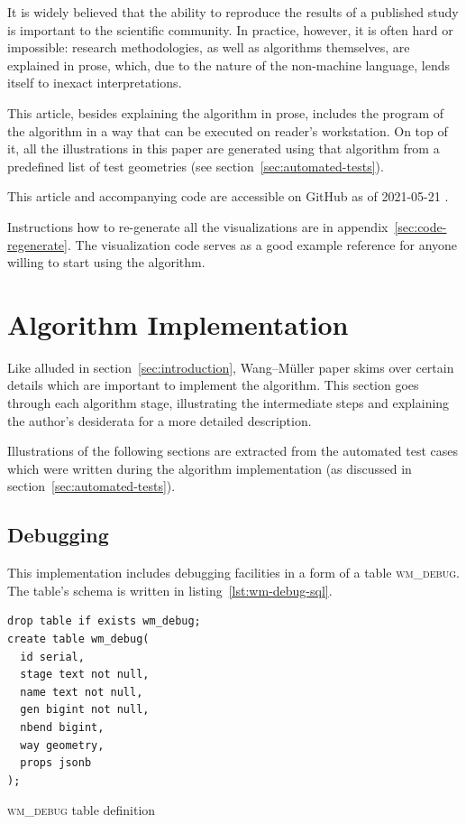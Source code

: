\documentclass[a4paper]{article}
\newcommand{\WM}{Wang--M{\"u}ller}
\begin{document}
It is widely believed that the ability to reproduce the results of a published
study is important to the scientific community. In practice, however, it is
often hard or impossible: research methodologies, as well as algorithms
themselves, are explained in prose, which, due to the nature of the non-machine
language, lends itself to inexact interpretations.

This article, besides explaining the algorithm in prose, includes the program
of the algorithm in a way that can be executed on reader's workstation. On top
of it, all the illustrations in this paper are generated using that algorithm
from a predefined list of test geometries (see
section~\ref{sec:automated-tests}).

This article and accompanying code are accessible on GitHub as of 2021-05-21
\cite{wmsql}.

Instructions how to re-generate all the visualizations are in
appendix~\ref{sec:code-regenerate}. The visualization code serves as a good
example reference for anyone willing to start using the algorithm.

\section{Algorithm Implementation}

Like alluded in section~\ref{sec:introduction}, {\WM} paper skims over
certain details which are important to implement the algorithm. This section
goes through each algorithm stage, illustrating the intermediate steps and
explaining the author's desiderata for a more detailed description.

Illustrations of the following sections are extracted from the automated test
cases which were written during the algorithm implementation (as discussed in
section~\ref{sec:automated-tests}).

\subsection{Debugging}
\label{sec:debugging}

This implementation includes debugging facilities in a form of a table
\textsc{wm\_debug}. The table's schema is written in
listing~\ref{lst:wm-debug-sql}.

\begin{listing}[h]
    \begin{verbatim}
drop table if exists wm_debug;
create table wm_debug(
  id serial,
  stage text not null,
  name text not null,
  gen bigint not null,
  nbend bigint,
  way geometry,
  props jsonb
);
    \end{verbatim}
    \caption{\textsc{wm\_debug} table definition}
    \label{lst:wm-debug-sql}
\end{listing}
\end{document}
